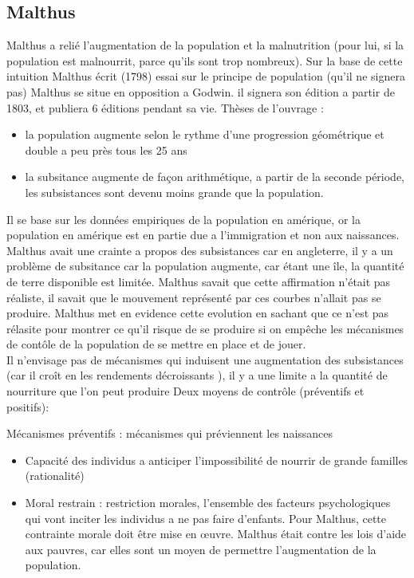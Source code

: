 \documentclass{article}
\begin{document}
\subsection{Malthus}
Malthus a relié l'augmentation de la population et la malnutrition (pour lui, si la population est malnourrit, parce qu'ils sont trop nombreux). Sur la base de cette intuition Malthus écrit (1798) essai sur le principe de population (qu'il ne signera pas) Malthus se situe en opposition a Godwin. il signera son édition a partir de 1803, et publiera 6 éditions pendant sa vie.
Thèses de l'ouvrage : 
\begin{itemize}
	\item la population augmente selon le rythme d'une progression géométrique et double a peu près tous les 25 ans
	\item la subsitance augmente de façon arithmétique, a partir de la seconde période, les subsistances sont devenu moins grande que la population.
\end{itemize}
Il se base sur les données empiriques de la population en amérique, or la population en amérique est en partie due a l'immigration et non aux naissances. Malthus avait une crainte a propos des subsistances car en angleterre, il y a un problème de subsitance car la population augmente, car étant une île, la quantité de terre disponible est limitée. Malthus savait que cette affirmation n'était pas réaliste, il savait que le mouvement représenté par ces courbes n'allait pas se produire. Malthus met en evidence cette evolution en sachant que ce n'est pas rélasite pour montrer ce qu'il risque de se produire si on empêche les mécanismes de contôle de la population de se mettre en place et de jouer. \\
Il n'envisage pas de mécanismes qui induisent une augmentation des subsistances (car il croît en les rendements décroissants ), il y a une limite a la quantité de nourriture que l'on peut produire 
Deux moyens de contrôle (préventifs et positifs):
\begin{itemize}
	\itme Mécanismes préventifs : mécanismes qui préviennent les naissances
	\begin{itemize}
		\item Capacité des individus a anticiper l'impossibilité de nourrir de grande familles (rationalité)
		\item Moral restrain : restriction morales, l'ensemble des facteurs psychologiques qui vont inciter les individus a ne pas faire d'enfants. Pour Malthus, cette contrainte morale doit être mise en œuvre. Malthus était contre les lois d'aide aux pauvres, car elles sont un moyen de permettre l'augmentation de la population.
	\end{itemize}
\end{itemize}
\end{document}
